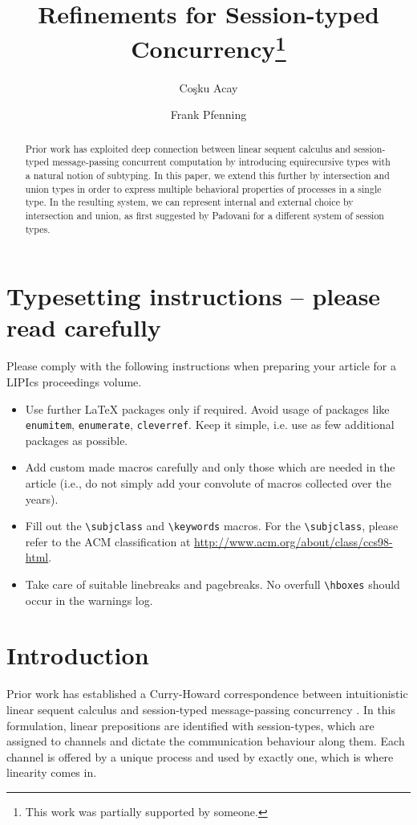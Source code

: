 \documentclass[a4paper,USenglish]{lipics-v2016}
\title{Refinements for Session-typed Concurrency\footnote{This work was partially supported by someone.}}
\author[1]{Co\c{s}ku Acay}
\author[2]{Frank Pfenning}
\affil[1]{Carnegie Mellon University, Pittsburgh, PA 15213 \\
  \texttt{cacay@cmu.edu}}
\affil[2]{Carnegie Mellon University, Pittsburgh, PA 15213 \\
  \texttt{fp@cs.cmu.edu}}
\begin{document}
\maketitle

\begin{abstract}
Prior work has exploited deep connection between linear sequent calculus and session-typed message-passing concurrent computation by introducing equirecursive types with a natural notion of subtyping. In this paper, we extend this further by intersection and union types in order to express multiple behavioral properties of processes in a single type. In the resulting system, we can represent internal and external choice by intersection and union, as first suggested by Padovani for a different system of session types.
\end{abstract}


\section{Typesetting instructions -- please read carefully}
Please comply with the following instructions when preparing your article for a LIPIcs proceedings volume. 
\begin{itemize}
\item Use further LaTeX packages only if required. Avoid usage of packages like \verb+enumitem+, \verb+enumerate+, \verb+cleverref+. Keep it simple, i.e. use as few additional packages as possible.
\item Add custom made macros carefully and only those which are needed in the article (i.e., do not simply add your convolute of macros collected over the years).
\item Fill out the \verb+\subjclass+ and \verb+\keywords+ macros. For the \verb+\subjclass+, please refer to the ACM classification at \url{http://www.acm.org/about/class/ccs98-html}.
\item Take care of suitable linebreaks and pagebreaks. No overfull \verb+\hboxes+ should occur in the warnings log.
\end{itemize}


\section{Introduction}

Prior work has established a Curry-Howard correspondence between intuitionistic linear sequent calculus and session-typed message-passing concurrency \cite{CairesP10, PfenningG15, Honda93}. In this formulation, linear prepositions are identified with session-types, which are assigned to channels and dictate the communication behaviour along them. Each channel is offered by a unique process and used by exactly one, which is where linearity comes in.
\end{document}
